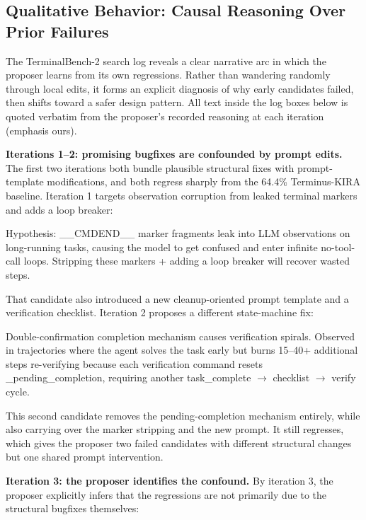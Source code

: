 \subsection{Qualitative Behavior: Causal Reasoning Over Prior Failures}
\label{app:qualitative-behavior}

The TerminalBench-2 search log reveals a clear narrative arc in which the proposer learns from its own regressions.
Rather than wandering randomly through local edits, it forms an explicit diagnosis of why early candidates failed, then shifts toward a safer design pattern.
All text inside the log boxes below is quoted verbatim from the proposer's recorded reasoning at each iteration (emphasis ours).

\textbf{Iterations 1--2: promising bugfixes are confounded by prompt edits.}
The first two iterations both bundle plausible structural fixes with prompt-template modifications, and both regress sharply from the 64.4\% Terminus-KIRA baseline.
Iteration 1 targets observation corruption from leaked terminal markers and adds a loop breaker:

\begin{logbox}
Hypothesis: \_\_CMDEND\_\_ marker fragments leak into LLM observations on long-running tasks, causing the model to get confused and enter infinite no-tool-call loops. Stripping these markers + adding a loop breaker will recover wasted steps.
\end{logbox}

That candidate also introduced a new cleanup-oriented prompt template and a verification checklist.
Iteration 2 proposes a different state-machine fix:

\begin{logbox}
Double-confirmation completion mechanism causes verification spirals. Observed in trajectories where the agent solves the task early but burns 15--40+ additional steps re-verifying because each verification command resets \_pending\_completion, requiring another task\_complete $\rightarrow$ checklist $\rightarrow$ verify cycle.
\end{logbox}

This second candidate removes the pending-completion mechanism entirely, while also carrying over the marker stripping and the new prompt.
It still regresses, which gives the proposer two failed candidates with different structural changes but one shared prompt intervention.

\textbf{Iteration 3: the proposer identifies the confound.}
By iteration 3, the proposer explicitly infers that the regressions are not primarily due to the structural bugfixes themselves:

